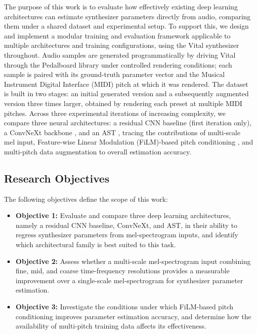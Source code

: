 The purpose of this work is to evaluate how effectively existing deep learning architectures can estimate synthesizer parameters directly from audio, comparing them under a shared dataset and experimental setup. To support this, we design and implement a modular training and evaluation framework applicable to multiple architectures and training configurations, using the Vital synthesizer throughout. Audio samples are generated programmatically by driving Vital through the Pedalboard library under controlled rendering conditions; each sample is paired with its ground-truth parameter vector and the Musical Instrument Digital Interface (MIDI) pitch at which it was rendered. The dataset is built in two stages: an initial generated version and a subsequently augmented version three times larger, obtained by rendering each preset at multiple MIDI pitches. Across three experimental iterations of increasing complexity, we compare three neural architectures: a residual CNN baseline \cite{he2016resnet} (first iteration only), a ConvNeXt backbone \cite{liu2022convnext}, and an AST \cite{gong2021ast}, tracing the contributions of multi-scale mel input, Feature-wise Linear Modulation (FiLM)-based pitch conditioning \cite{perez2018film}, and multi-pitch data augmentation to overall estimation accuracy.

\subsection{Research Objectives}

The following objectives define the scope of this work:

\begin{itemize}

\item[$\blacksquare$] \textbf{Objective 1:} Evaluate and compare three deep learning architectures, namely a residual CNN baseline, ConvNeXt, and AST, in their ability to regress synthesizer parameters from mel-spectrogram inputs, and identify which architectural family is best suited to this task.

\item[$\blacksquare$] \textbf{Objective 2:} Assess whether a multi-scale mel-spectrogram input combining fine, mid, and coarse time-frequency resolutions provides a measurable improvement over a single-scale mel-spectrogram for synthesizer parameter estimation.

\item[$\blacksquare$] \textbf{Objective 3:} Investigate the conditions under which FiLM-based pitch conditioning improves parameter estimation accuracy, and determine how the availability of multi-pitch training data affects its effectiveness.

\end{itemize}

